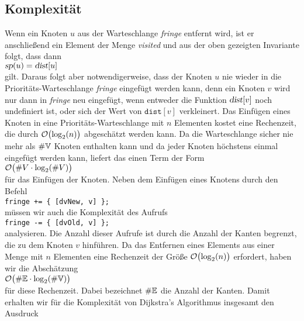 \subsection{Komplexit\"at}
Wenn ein Knoten $u$ aus der Warteschlange \textsl{fringe} entfernt wird, ist er anschlie\ss{}end ein Element der
Menge \textsl{visited} und aus der oben gezeigten Invariante folgt, dass dann 
\\[0.2cm]
\hspace*{1.3cm}
$\textsl{sp}(u) = \textsl{dist}[u]$
\\[0.2cm]
gilt.  Daraus folgt aber notwendigerweise, dass der Knoten $u$ nie wieder in die Priorit\"ats-Warteschlange
\textsl{fringe}
eingef\"ugt werden kann, denn ein Knoten $v$ wird nur dann in \textsl{fringe} neu eingef\"ugt, wenn
entweder die Funktion $\textsl{dist}[v]$ noch undefiniert ist, oder sich der Wert von
$\texttt{dist}[v]$ verkleinert.  
Das Einf\"ugen eines Knoten in eine Priorit\"ats-Warteschlange mit $n$
Elementen kostet eine Rechenzeit, die durch $\mathcal{O}\bigl(\log_2(n)\bigr)$ abgesch\"atzt werden kann.  Da die
Warteschlange sicher nie mehr als $\#{\mathbb V}$ Knoten enthalten kann und da jeder Knoten h\"ochstens einmal eingef\"ugt
werden kann, liefert das einen Term der Form 
\\[0.2cm]
\hspace*{1.3cm}
$\mathcal{O}\bigl(\#V \cdot \log_2(\#V)\bigr)$ 
\\[0.2cm]
f\"ur das Einf\"ugen der Knoten.  Neben dem Einf\"ugen eines Knotens durch den Befehl
\\[0.2cm]
\hspace*{1.3cm}
\texttt{fringe += \{ [dvNew, v] \};}
\\[0.2cm]
m\"ussen wir auch die Komplexit\"at des Aufrufs
\\[0.2cm]
\hspace*{1.3cm}
\texttt{fringe -= \{ [dvOld, v] \};} 
\\[0.2cm]
analysieren.
Die Anzahl dieser Aufrufe ist durch die Anzahl der Kanten begrenzt, die zu dem Knoten $v$ hinf\"uhren.
Da das Entfernen eines Elements aus einer Menge mit $n$ Elementen eine Rechenzeit
der Gr\"o\ss{}e $\mathcal{O}\bigl(\log_2(n)\bigr)$ erfordert, haben wir die Absch\"atzung
\\[0.2cm]
\hspace*{1.3cm}
$\mathcal{O}\bigl(\#{\mathbb E} \cdot \log_2(\#{\mathbb V})\bigr)$
\\[0.2cm]
f\"ur diese Rechenzeit.
Dabei bezeichnet $\#{\mathbb E}$ die Anzahl der Kanten. Damit erhalten wir f\"ur die
Komplexit\"at von Dijkstra's Algorithmus insgesamt den Ausdruck \\[0.2cm]
